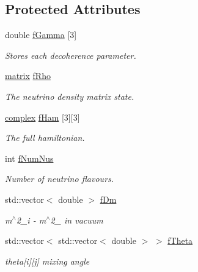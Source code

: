 \subsection*{Protected Attributes}
\begin{DoxyCompactItemize}
\item 
double \hyperlink{classOscProb_1_1PMNS__Deco_ae2f30ac9f8b25344959f1698616d337a}{f\+Gamma} \mbox{[}3\mbox{]}
\begin{DoxyCompactList}\small\item\em Stores each decoherence parameter. \end{DoxyCompactList}\item 
\hyperlink{classOscProb_1_1PMNS__Deco_a77b4e0c041b6268910a270be0f5387c9}{matrix} \hyperlink{classOscProb_1_1PMNS__Deco_a0488d62b4ef4cf5b43425769f5fcdbdf}{f\+Rho}
\begin{DoxyCompactList}\small\item\em The neutrino density matrix state. \end{DoxyCompactList}\item 
\hyperlink{classOscProb_1_1PMNS__Base_ae86ec4718808ce9d02e5f5b4226714ab}{complex} \hyperlink{classOscProb_1_1PMNS__Fast_aab37f2a7f59ab7026a8a21a561115dd0}{f\+Ham} \mbox{[}3\mbox{]}\mbox{[}3\mbox{]}
\begin{DoxyCompactList}\small\item\em The full hamiltonian. \end{DoxyCompactList}\item 
int \hyperlink{classOscProb_1_1PMNS__Base_a24bb74bed63569dfe88b18fa6a08060e}{f\+Num\+Nus}
\begin{DoxyCompactList}\small\item\em Number of neutrino flavours. \end{DoxyCompactList}\item 
std\+::vector$<$ double $>$ \hyperlink{classOscProb_1_1PMNS__Base_a406a31c3b5d620e5a0cace5b411f9f70}{f\+Dm}
\begin{DoxyCompactList}\small\item\em m$^\wedge$2\+\_\+i -\/ m$^\wedge$2\+\_ in vacuum \end{DoxyCompactList}\item 
std\+::vector$<$ std\+::vector$<$ double $>$ $>$ \hyperlink{classOscProb_1_1PMNS__Base_a1976887cd658dd86b2336c181f1470b4}{f\+Theta}
\begin{DoxyCompactList}\small\item\em theta\mbox{[}i\mbox{]}\mbox{[}j\mbox{]} mixing angle \end{DoxyCompactList}\item 

\end{DoxyCompactItemize}
